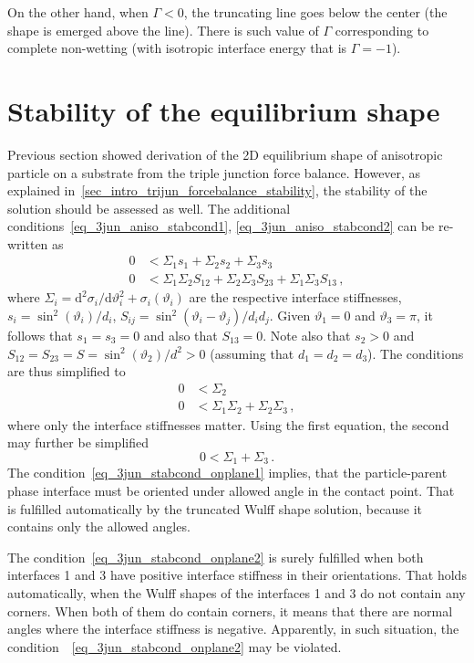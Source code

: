 On the other hand, when $\Gamma < 0$, the truncating line goes below the center (the shape is emerged above the line). There is such value of $\Gamma$ corresponding to complete non-wetting (with isotropic interface energy that is $\Gamma=-1$).

\section{Stability of the equilibrium shape}\label{sec_fund_anisoIE_trijun_stability}
Previous section showed derivation of the 2D equilibrium shape of anisotropic particle on a substrate from the triple junction force balance. However, as explained in~\ref{sec_intro_trijun_forcebalance_stability}, the stability of the solution should be assessed as well. The additional conditions~\eqref{eq_3jun_aniso_stabcond1}, \eqref{eq_3jun_aniso_stabcond2} can be re-written as
\begin{align}
    0 &< \Sigma_1 s_1 + \Sigma_2 s_2 + \Sigma_3 s_3 \\
    0 &< \Sigma_1\Sigma_2 S_{12} + \Sigma_2\Sigma_3 S_{23} + \Sigma_1\Sigma_3 S_{13} \,,
\end{align}
where $\Sigma_i = \mathrm{d}^2 \sigma_i/\mathrm{d} \vartheta_i^2 + \sigma_i(\vartheta_i)$ are the respective interface stiffnesses, $s_i = \sin^2(\vartheta_i)/d_i$, $S_{ij} = \sin^2(\vartheta_i-\vartheta_j)/d_i d_j$. Given $\vartheta_1=0$ and $\vartheta_3=\pi$, it follows that $s_1=s_3=0$ and also that $S_{13}=0$. Note also that $s_2>0$ and $S_{12}=S_{23}=S=\sin^2(\vartheta_2)/d^2>0$ (assuming that $d_1=d_2=d_3$). The conditions are thus simplified to
\begin{align}
    0 &< \Sigma_2  \label{eq_3jun_stabcond_onplane1}\\
    0 &< \Sigma_1\Sigma_2 + \Sigma_2\Sigma_3 \,,  
\end{align}
where only the interface stiffnesses matter. Using the first equation, the second may further be simplified
\begin{equation}
    0< \Sigma_1 + \Sigma_3 \,. \label{eq_3jun_stabcond_onplane2}
\end{equation}
The condition~\eqref{eq_3jun_stabcond_onplane1} implies, that the particle-parent phase interface must be oriented under allowed angle in the contact point. That is fulfilled automatically by the truncated Wulff shape solution, because it contains only the allowed angles. 

The condition~\eqref{eq_3jun_stabcond_onplane2} is surely fulfilled when both interfaces 1 and 3 have positive interface stiffness in their orientations. That holds automatically, when the Wulff shapes of the interfaces 1 and 3 do not contain any corners. When both of them do contain corners, it means that there are normal angles where the interface stiffness is negative. Apparently, in such situation, the condition~~\eqref{eq_3jun_stabcond_onplane2} may be violated.

